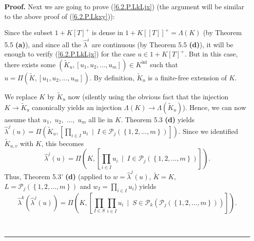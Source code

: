 \documentclass[numbers=enddot,12pt,final,onecolumn,notitlepage]{scrartcl}%
\newenvironment{proof}[1][Proof]{\noindent\textbf{#1.} }{\ \rule{0.5em}{0.5em}}
\begin{document}
\begin{proof}
Next we are going to prove (\ref{6.2.P.LkLjx}) (the argument will be similar
to the above proof of (\ref{6.2.P.Lkxy})):

Since the subset $1+K\left[  T\right]  ^{+}$ is dense in $1+K\left[  \left[
T\right]  \right]  ^{+}=\Lambda\left(  K\right)  $ (by Theorem 5.5
\textbf{(a)}), and since all the $\widehat{\lambda}^{i}$ are continuous (by
Theorem 5.5 \textbf{(d)}), it will be enough to verify (\ref{6.2.P.LkLjx}) for
the case $u\in1+K\left[  T\right]  ^{+}$. But in this case, there exists some
$\left(  \widetilde{K}_{u},\left[  u_{1},u_{2},...,u_{m}\right]  \right)  \in
K^{\operatorname*{int}}$ such that $u=\Pi\left(  \widetilde{K},\left[
u_{1},u_{2},...,u_{m}\right]  \right)  $. By definition, $\widetilde{K}_{u}$
is a finite-free extension of $K$.

We replace $K$ by $\widetilde{K}_{u}$ now (silently using the obvious fact
that the injection $K\rightarrow\widetilde{K}_{u}$ canonically yields an
injection $\Lambda\left(  K\right)  \rightarrow\Lambda\left(  \widetilde{K}%
_{u}\right)  $). Hence, we can now assume that $u_{1},$ $u_{2},$ $...,$
$u_{m}$ all lie in $K$. Theorem 5.3 \textbf{(d)} yields $\widehat{\lambda}%
^{j}\left(  u\right)  =\Pi\left(  \widetilde{K}_{u},\left[  \prod\limits_{i\in
I}u_{i}\ \mid\ I\in\mathcal{P}_{j}\left(  \left\{  1,2,...,m\right\}  \right)
\right]  \right)  $. Since we identified $\widetilde{K}_{u,v}$ with $K$, this
becomes%
\[
\widehat{\lambda}^{j}\left(  u\right)  =\Pi\left(  K,\left[  \prod
\limits_{i\in I}u_{i}\ \mid\ I\in\mathcal{P}_{j}\left(  \left\{
1,2,...,m\right\}  \right)  \right]  \right)  .
\]
Thus, Theorem 5.3' \textbf{(d)} (applied to $w=\widehat{\lambda}^{j}\left(
u\right)  $, $\widetilde{K}=K$, $L=\mathcal{P}_{j}\left(  \left\{
1,2,...,m\right\}  \right)  $ and $w_{I}=\prod\limits_{i\in I}u_{i}$) yields%
\[
\widehat{\lambda}^{k}\left(  \widehat{\lambda}^{j}\left(  u\right)  \right)
=\Pi\left(  K,\left[  \prod_{I\in S}\prod\limits_{i\in I}u_{i}\ \mid
\ S\in\mathcal{P}_{k}\left(  \mathcal{P}_{j}\left(  \left\{
1,2,...,m\right\}  \right)  \right)  \right]  \right)  .
\]



\end{proof}
\end{document}
